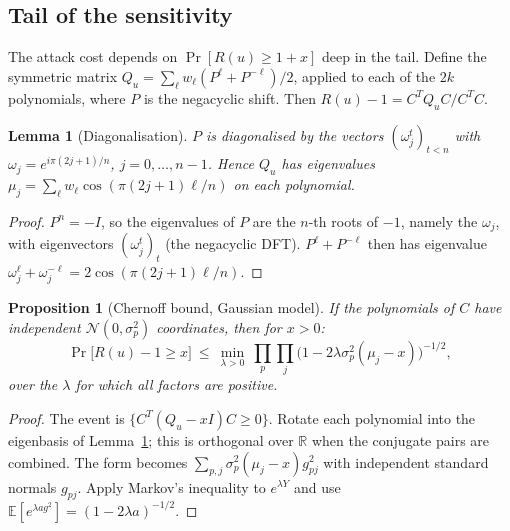 \documentclass[11pt,a4paper]{article}
\newtheorem{lemma}[theorem]{Lemma}
\newtheorem{proposition}[theorem]{Proposition}
\theoremstyle{definition}
\theoremstyle{remark}
\newcommand{\R}{\mathbb{R}}
\begin{document}
\subsection{Tail of the sensitivity}
The attack cost depends on $\Pr[R(u)\ge1+x]$ deep in the tail. Define the symmetric matrix $Q_u=\sum_\ell w_\ell(P^\ell+P^{-\ell})/2$, applied to each of the $2k$ polynomials, where $P$ is the negacyclic shift. Then $R(u)-1=C^TQ_uC/C^TC$.

\begin{lemma}[Diagonalisation]\label{lem:eig}
$P$ is diagonalised by the vectors $(\omega_j^t)_{t<n}$ with $\omega_j=e^{i\pi(2j+1)/n}$, $j=0,\dots,n-1$. Hence $Q_u$ has eigenvalues $\mu_j=\sum_\ell w_\ell\cos(\pi(2j+1)\ell/n)$ on each polynomial.
\end{lemma}
\begin{proof}
$P^n=-I$, so the eigenvalues of $P$ are the $n$-th roots of $-1$, namely the $\omega_j$, with eigenvectors $(\omega_j^t)_t$ (the negacyclic DFT). $P^\ell+P^{-\ell}$ then has eigenvalue $\omega_j^\ell+\omega_j^{-\ell}=2\cos(\pi(2j+1)\ell/n)$.
\end{proof}

\begin{proposition}[Chernoff bound, Gaussian model]\label{prop:chernoff}
If the polynomials of $C$ have independent $\mathcal N(0,\sigma_p^2)$ coordinates, then for $x>0$:
\[ \Pr\!\big[R(u)-1\ge x\big]\ \le\ \min_{\lambda>0}\ \prod_{p}\prod_{j}\big(1-2\lambda\sigma_p^2(\mu_j-x)\big)^{-1/2}, \]
over the $\lambda$ for which all factors are positive.
\end{proposition}
\begin{proof}
The event is $\{C^T(Q_u-xI)C\ge0\}$. Rotate each polynomial into the eigenbasis of Lemma~\ref{lem:eig}; this is orthogonal over $\R$ when the conjugate pairs are combined. The form becomes $\sum_{p,j}\sigma_p^2(\mu_j-x)g_{pj}^2$ with independent standard normals $g_{pj}$. Apply Markov's inequality to $e^{\lambda Y}$ and use $\mathbb E[e^{\lambda a g^2}]=(1-2\lambda a)^{-1/2}$.
\end{proof}
\end{document}

